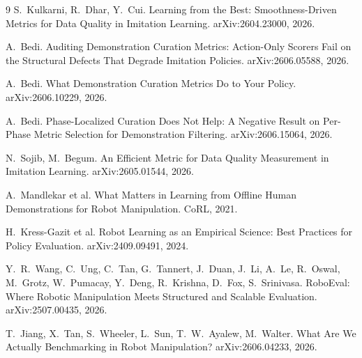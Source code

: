 \documentclass{article}
\begin{document}

\begin{thebibliography}{9}
S.~Kulkarni, R.~Dhar, Y.~Cui.
\newblock Learning from the Best: Smoothness-Driven Metrics for Data Quality
in Imitation Learning.
\newblock arXiv:2604.23000, 2026.

A.~Bedi.
\newblock Auditing Demonstration Curation Metrics: Action-Only Scorers Fail
on the Structural Defects That Degrade Imitation Policies.
\newblock arXiv:2606.05588, 2026.

A.~Bedi.
\newblock What Demonstration Curation Metrics Do to Your Policy.
\newblock arXiv:2606.10229, 2026.

A.~Bedi.
\newblock Phase-Localized Curation Does Not Help: A Negative Result on
Per-Phase Metric Selection for Demonstration Filtering.
\newblock arXiv:2606.15064, 2026.

N.~Sojib, M.~Begum.
\newblock An Efficient Metric for Data Quality Measurement in Imitation
Learning.
\newblock arXiv:2605.01544, 2026.

A.~Mandlekar et al.
\newblock What Matters in Learning from Offline Human Demonstrations for
Robot Manipulation.
\newblock CoRL, 2021.

H.~Kress-Gazit et al.
\newblock Robot Learning as an Empirical Science: Best Practices for Policy
Evaluation.
\newblock arXiv:2409.09491, 2024.

Y.~R.~Wang, C.~Ung, C.~Tan, G.~Tannert, J.~Duan, J.~Li, A.~Le, R.~Oswal,
M.~Grotz, W.~Pumacay, Y.~Deng, R.~Krishna, D.~Fox, S.~Srinivasa.
\newblock RoboEval: Where Robotic Manipulation Meets Structured and Scalable
Evaluation.
\newblock arXiv:2507.00435, 2026.

T.~Jiang, X.~Tan, S.~Wheeler, L.~Sun, T.~W.~Ayalew, M.~Walter.
\newblock What Are We Actually Benchmarking in Robot Manipulation?
\newblock arXiv:2606.04233, 2026.
\end{thebibliography}
\end{document}
